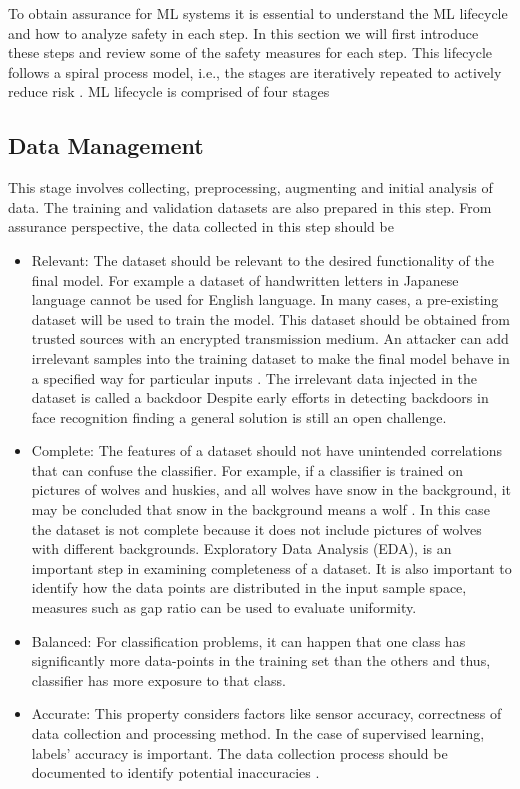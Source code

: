 To obtain assurance for ML systems it is essential to understand the ML lifecycle and how to analyze safety in each step. In this section we will first introduce these steps and review some of the safety measures for each step. This lifecycle follows a spiral process model, i.e., the stages are iteratively repeated to actively reduce risk \cite{Boehm2000}. ML lifecycle is comprised of four stages \cite{Ashmore2021} 

\subsection{Data Management}
\label{sub:DM}
This stage involves collecting, preprocessing, augmenting and initial analysis of data. The training and validation datasets are also prepared in this step.
From assurance perspective, the data collected in this step should be
\begin{itemize}
    \item Relevant: The dataset should be relevant to the desired functionality of the final model. For example a dataset of handwritten letters in Japanese language cannot be used for English language. In many cases, a pre-existing dataset will be used to train the model. This dataset should be obtained from trusted sources with an encrypted transmission medium. An attacker can add irrelevant samples into the training dataset to make the final model behave in a specified way for particular inputs \cite{Chen2017}. The irrelevant data injected in the dataset is called a backdoor \cite{Chen2017} Despite early efforts in detecting backdoors in face recognition \cite{Wang2019} finding a general solution is still an open challenge.
    \item Complete: The features of a dataset should not have unintended correlations that can confuse the classifier. For example, if a classifier is trained on pictures of wolves and huskies, and all wolves have snow in the background, it may be concluded that snow in the background means a wolf \cite{Ribeiro2016}. In this case the dataset is not complete because it does not include pictures of wolves with different backgrounds. Exploratory Data Analysis (EDA), is an important step in examining completeness of a dataset. It is also important to identify how the data points are distributed in the input sample space, measures such as gap ratio \cite{Teramoto} can be used to evaluate uniformity.
    \item Balanced: For classification problems, it can happen that one class has significantly more data-points in the training set than the others and thus, classifier has more exposure to that class. 
    \item Accurate: This property considers factors like sensor accuracy, correctness of data collection and processing method. In the case of supervised learning, labels' accuracy is important. The data collection process should be documented to identify potential inaccuracies \cite{Ashmore2021}.
\end{itemize} 

